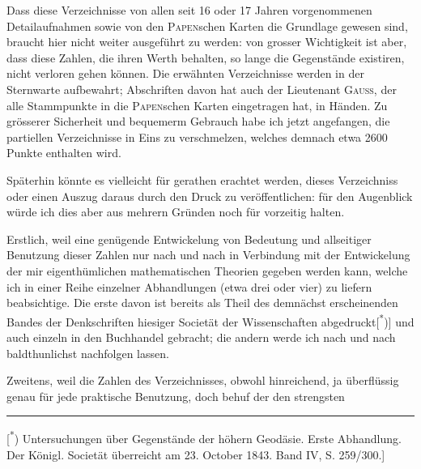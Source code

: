\par\noindent\hspace*{\parindent}Dass diese Verzeichnisse von allen seit 16 oder 17 Jahren vorgenommenen Detailaufnahmen sowie von den \textsc{Papen}schen Karten die Grundlage gewesen sind, braucht hier nicht weiter ausgeführt zu werden: von grosser Wichtigkeit ist aber, dass diese Zahlen, die ihren Werth behalten, so lange die Gegenstände existiren, nicht verloren gehen können. Die erwähnten Verzeichnisse werden in der Sternwarte aufbewahrt; Abschriften davon hat auch der Lieutenant \textsc{Gauss}, der alle Stammpunkte in die \textsc{Papen}schen Karten eingetragen hat, in Händen. Zu grösserer Sicherheit und bequemerm Gebrauch habe ich jetzt angefangen, die partiellen Verzeichnisse in Eins zu verschmelzen, welches demnach etwa 2600 Punkte enthalten wird.

\par\noindent\hspace*{\parindent}Späterhin könnte es vielleicht für gerathen erachtet werden, dieses Verzeichniss oder einen Auszug daraus durch den Druck zu veröffentlichen: für den Augenblick würde ich dies aber aus mehrern Gründen noch für vorzeitig halten.

\par\noindent\hspace*{\parindent}Erstlich, weil eine  genügende Entwickelung von Bedeutung und allseitiger Benutzung dieser Zahlen nur nach und nach in Verbindung mit der Entwickelung der mir eigenthümlichen mathematischen Theorien gegeben werden kann, welche ich in einer Reihe einzelner Abhandlungen (etwa drei oder vier) zu liefern beabsichtige. Die erste davon ist bereits als Theil des demnächst erscheinenden Bandes der Denkschriften hiesiger Societät der Wissenschaften abgedruckt[\textsuperscript{*})] und auch einzeln in den Buchhandel gebracht; die andern werde ich nach und nach baldthunlichst nachfolgen lassen.

\par\noindent\hspace*{\parindent}Zweitens, weil die Zahlen des Verzeichnisses, obwohl hinreichend, ja überflüssig genau für jede praktische Benutzung, doch behuf der den strengsten

\par\smallskip\noindent\rule{.24\linewidth}{.4pt}\par\smallskip
{\footnotesize\noindent\hspace*{\parindent}[\textsuperscript{*}) Untersuchungen über Gegenstände der höhern Geodäsie. Erste Abhandlung. Der Königl. Societät überreicht am 23. October 1843. Band IV, S. 259/300.]\par}

